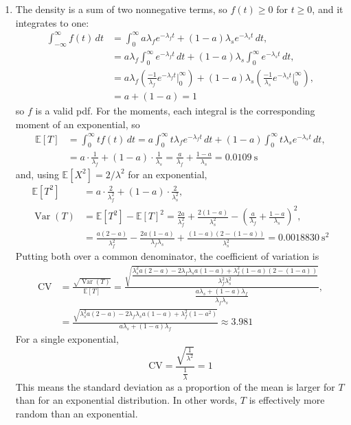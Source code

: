 \documentclass[11pt]{article}
\begin{document}
\begin{enumerate}[label=(\alph*)]
    \item
    The density is a sum of two nonnegative terms, so $f(t) \ge 0$ for $t \ge 0$, and it integrates
    to one:
    \begin{align*}
        \int_{-\infty}^{\infty} f(t) \, dt
        &= \int_{0}^{\infty} a\lambda_f e^{-\lambda_f t} + (1-a)\lambda_s e^{-\lambda_s t} \, dt, \\
        &= a\lambda_f \int_{0}^{\infty} e^{-\lambda_f t} \, dt
         + (1-a)\lambda_s \int_{0}^{\infty} e^{-\lambda_s t} \, dt, \\
        &= a\lambda_f\left(\frac{-1}{\lambda_f}e^{-\lambda_f t}\Big|_{0}^{\infty}\right)
         + (1-a)\lambda_s\left(\frac{-1}{\lambda_s}e^{-\lambda_s t}\Big|_{0}^{\infty}\right), \\
        &= a + (1-a) = 1
    \end{align*}
    so $f$ is a valid pdf. For the moments, each integral is the corresponding moment of an
    exponential, so
    \begin{align*}
        \mathbb{E}[T] &= \int_{0}^{\infty} t f(t) \, dt
        = a \int_{0}^{\infty} t \lambda_f e^{-\lambda_f t} \, dt
        + (1-a) \int_{0}^{\infty} t \lambda_s e^{-\lambda_s t} \, dt, \\
        &= a \cdot \frac{1}{\lambda_f} + (1-a) \cdot \frac{1}{\lambda_s}
         = \frac{a}{\lambda_f} + \frac{1-a}{\lambda_s} = \num{0.0109}\ \mathrm{s}
    \end{align*}
    and, using $\mathbb{E}[X^2] = 2/\lambda^2$ for an exponential,
    \begin{align*}
        \mathbb{E}[T^2] &= a \cdot \frac{2}{\lambda_f^2} + (1-a) \cdot \frac{2}{\lambda_s^2}, \\
        \operatorname{Var}(T) &= \mathbb{E}[T^2] - \mathbb{E}[T]^2
        = \frac{2a}{\lambda_f^2} + \frac{2(1-a)}{\lambda_s^2}
          - \left(\frac{a}{\lambda_f} + \frac{1-a}{\lambda_s}\right)^2, \\
        &= \frac{a(2-a)}{\lambda_f^2} - \frac{2a(1-a)}{\lambda_f \lambda_s}
         + \frac{(1-a)\left(2-(1-a)\right)}{\lambda_s^2}
         = \num{0.0018830}\ \mathrm{s}^2
    \end{align*}
    Putting both over a common denominator, the coefficient of variation is
    \begin{align*}
        \mathrm{CV} &= \frac{\sqrt{\operatorname{Var}(T)}}{\mathbb{E}[T]}
        = \frac{\sqrt{\dfrac{\lambda_s^2 a(2-a) - 2\lambda_f\lambda_s a(1-a)
            + \lambda_f^2 (1-a)\left(2-(1-a)\right)}{\lambda_f^2 \lambda_s^2}}}
          {\dfrac{a\lambda_s + (1-a)\lambda_f}{\lambda_f \lambda_s}}, \\
        &= \frac{\sqrt{\lambda_s^2 a(2-a) - 2\lambda_f\lambda_s a(1-a) + \lambda_f^2 (1-a^2)}}
                {a\lambda_s + (1-a)\lambda_f}
        \approx \num{3.981}
    \end{align*}
    For a single exponential,
    \[
        \mathrm{CV} = \frac{\sqrt{\frac{1}{\lambda^2}}}{\frac{1}{\lambda}} = 1
    \]
    This means the standard deviation as a proportion of the mean is larger for $T$ than for an
    exponential distribution. In other words, $T$ is effectively more random than an exponential.


\end{enumerate}
\end{document}
